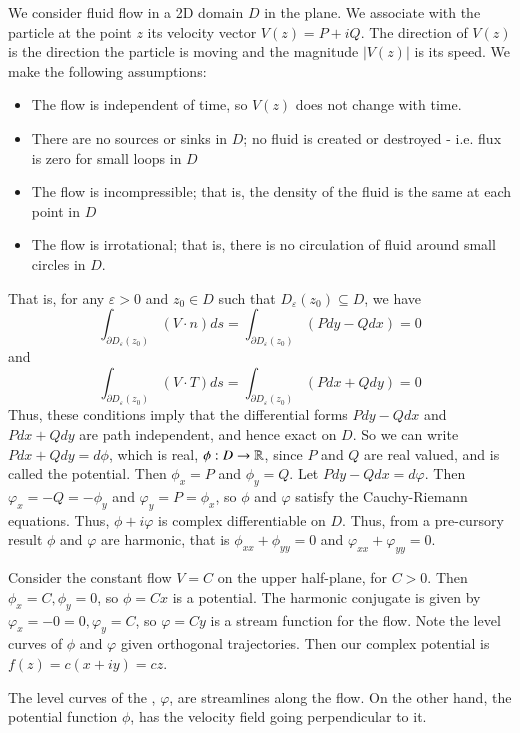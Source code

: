 We consider fluid flow in a 2D domain $D$ in the plane. We associate with the particle at the point $z$ its velocity vector $V(z) = P+iQ$. The direction of $V(z)$ is the direction the particle is moving and the magnitude $|V(z)|$ is its speed. We make the following assumptions: 
\begin{itemize}
    \item The flow is independent of time, so $V(z)$ does not change with time.
    \item There are no sources or sinks in $D$; no fluid is created or destroyed - i.e. flux is zero for small loops in $D$
    \item The flow is incompressible; that is, the density of the fluid is the same at each point in $D$
    \item The flow is irrotational; that is, there is no circulation of fluid around small circles in $D$.
\end{itemize}
That is, for any $\varepsilon > 0$ and $z_0 \in D$ such that $D_{\varepsilon}(z_0) \subseteq D$, we have \begin{equation*}
    \int_{\partial D_{\varepsilon}(z_0)}(V\cdot n)ds = \int_{\partial D_{\varepsilon}(z_0)}(Pdy-Qdx)= 0
\end{equation*}
and \begin{equation*}
    \int_{\partial D_{\varepsilon}(z_0)}(V\cdot T)ds = \int_{\partial D_{\varepsilon}(z_0)}(Pdx+Qdy) = 0
\end{equation*}
Thus, these conditions imply that the differential forms $Pdy-Qdx$ and $Pdx+Qdy$ are path independent, and hence exact on $D$. So we can write $Pdx+Qdy = d\phi$, which is real, $\phi:D\rightarrow \mathbb R$, since $P$ and $Q$ are real valued, and is called the potential. Then $\phi_x = P$ and $\phi_y = Q$. Let $Pdy-Qdx = d\varphi$. Then $\varphi_x = -Q = -\phi_y$ and $\varphi_y = P = \phi_x$, so $\phi$ and $\varphi$ satisfy the Cauchy-Riemann equations. Thus, $\phi+i\varphi$ is complex differentiable on $D$. Thus, from a pre-cursory result $\phi$ and $\varphi$ are harmonic, that is $\phi_{xx}+\phi_{yy} = 0$ and $\varphi_{xx}+\varphi_{yy} = 0$.

\begin{example}
    Consider the constant flow $V = C$ on the upper half-plane, for $C > 0$. Then $\phi_x = C,\phi_y = 0$, so $\phi = Cx$ is a potential. The harmonic conjugate is given by $\varphi_x = -0 = 0,\varphi_y = C$, so $\varphi= Cy$ is a stream function for the flow. Note the level curves of $\phi$ and $\varphi$ given orthogonal trajectories. Then our complex potential is $f(z) = c(x+iy)=cz$. 
\end{example}
The level curves of the , $\varphi$, are streamlines along the flow. On the other hand, the potential function $\phi$, has the velocity field going perpendicular to it.

